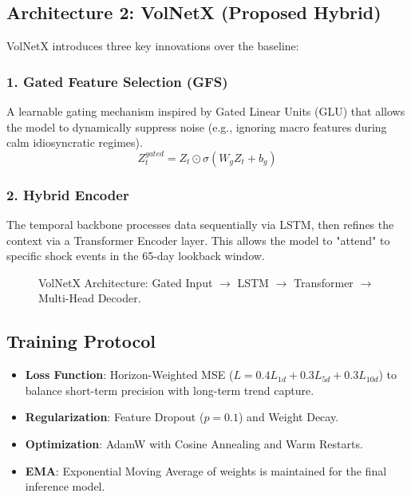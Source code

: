 \documentclass[11pt, a4paper]{article}
\begin{document}
\subsection{Architecture 2: VolNetX (Proposed Hybrid)}
VolNetX introduces three key innovations over the baseline:

\subsubsection{1. Gated Feature Selection (GFS)}
A learnable gating mechanism inspired by Gated Linear Units (GLU) that allows the model to dynamically suppress noise (e.g., ignoring macro features during calm idiosyncratic regimes).
\begin{equation}
    Z_t^{gated} = Z_t \odot \sigma(W_g Z_t + b_g)
\end{equation}

\subsubsection{2. Hybrid Encoder}
The temporal backbone processes data sequentially via LSTM, then refines the context via a Transformer Encoder layer. This allows the model to "attend" to specific shock events in the 65-day lookback window.

\begin{figure}[H]
    \centering
    \caption{VolNetX Architecture: Gated Input $\rightarrow$ LSTM $\rightarrow$ Transformer $\rightarrow$ Multi-Head Decoder.}
\end{figure}

\subsection{Training Protocol}
\begin{itemize}
    \item \textbf{Loss Function}: Horizon-Weighted MSE ($L = 0.4 L_{1d} + 0.3 L_{5d} + 0.3 L_{10d}$) to balance short-term precision with long-term trend capture.
    \item \textbf{Regularization}: Feature Dropout ($p=0.1$) and Weight Decay.
    \item \textbf{Optimization}: AdamW with Cosine Annealing and Warm Restarts.
    \item \textbf{EMA}: Exponential Moving Average of weights is maintained for the final inference model.
\end{itemize}
\end{document}
